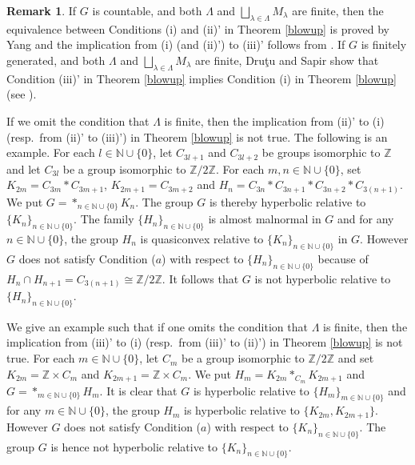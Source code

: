 \documentclass{amsart}
\theoremstyle{definition}
\newtheorem{Rem}[Thm]{Remark}
\begin{document}
\begin{Rem}
If $G$ is countable, and both $\Lambda$ and $\bigsqcup_{\lambda\in \Lambda}M_\lambda$ are finite, then the equivalence between Conditions (i) and (ii)' in Theorem \ref{blowup} is proved by Yang \cite[Theorem 1.1]{Yan11} and the implication from (i) (and (ii)') to (iii)' follows from \cite[Theorem 1.1 and Corollary 3.5]{Yan11}. 
If $G$ is finitely generated, and both $\Lambda$ and $\bigsqcup_{\lambda\in \Lambda}M_\lambda$ are finite, Dru\c{t}u and Sapir show that Condition (iii)' in Theorem \ref{blowup} implies Condition (i) in Theorem \ref{blowup} (see \cite[Corollary 1.14]{D-S05}). 
\end{Rem}

If we omit the condition that $\Lambda$ is finite, then the implication from (ii)' to (i) (resp.\ from (ii)' to (iii)') in Theorem \ref{blowup} is not true. 
The following is an example. 
For each $l\in \mathbb N \cup \{0\}$, let $C_{3l+1}$ and $C_{3l+2}$ be groups isomorphic to $\mathbb Z$ and let $C_{3l}$ be a group isomorphic to $\mathbb Z/2\mathbb Z$. 
For each $m, n\in \mathbb N \cup \{0\}$, set $K_{2m}=C_{3m}\ast C_{3m+1}$, $K_{2m+1}=C_{3m+2}$ and $H_n=C_{3n}\ast C_{3n+1}\ast C_{3n+2}\ast C_{3(n+1)}$. 
We put $G=\ast_{n\in \mathbb N\cup \{0\}}K_n$. 
The group $G$ is thereby hyperbolic relative to $\{K_n\}_{n\in\mathbb N \cup \{0\}}$. 
The family $\{H_n\}_{n\in\mathbb N\cup \{0\}}$ is almost malnormal in $G$ and for any $n\in \mathbb N \cup \{0\}$, the group $H_n$ is quasiconvex relative to $\{K_n\}_{n\in\mathbb N\cup \{0\}}$ in $G$. 
However $G$ does not satisfy Condition ($a$) with respect to $\{H_n\}_{n\in\mathbb N\cup \{0\}}$ because of $H_n \cap H_{n+1}=C_{3(n+1)}\cong \mathbb Z / 2\mathbb Z$. 
It follows that $G$ is not hyperbolic relative to $\{H_n\}_{n\in \mathbb N \cup \{0\}}$. 

We give an example such that if one omits the condition that $\Lambda$ is finite, then the implication from (iii)' to (i) (resp.\ from (iii)' to (ii)') in Theorem \ref{blowup} is not true. 
For each $m\in \mathbb N \cup \{0\}$, let $C_m$ be a group isomorphic to $\mathbb Z /2\mathbb Z$ and set $K_{2m}=\mathbb Z \times C_m$ and $K_{2m+1}=\mathbb Z \times C_m$. 
We put $H_m=K_{2m}\ast_{C_m}K_{2m+1}$ and $G=\ast_{m\in \mathbb N \cup \{0\}}H_m$. 
It is clear that $G$ is hyperbolic relative to $\{H_m\}_{m\in \mathbb N\cup \{0\}}$ and for any $m\in \mathbb N\cup \{0\}$, the group $H_m$ is hyperbolic relative to $\{K_{2m}, K_{2m+1}\}$. 
However $G$ does not satisfy Condition ($a$) with respect to $\{K_n\}_{n\in \mathbb N\cup \{0\}}$. 
The group $G$ is hence not hyperbolic relative to $\{K_n\}_{n\in \mathbb N\cup \{0\}}$. 
\end{document}
